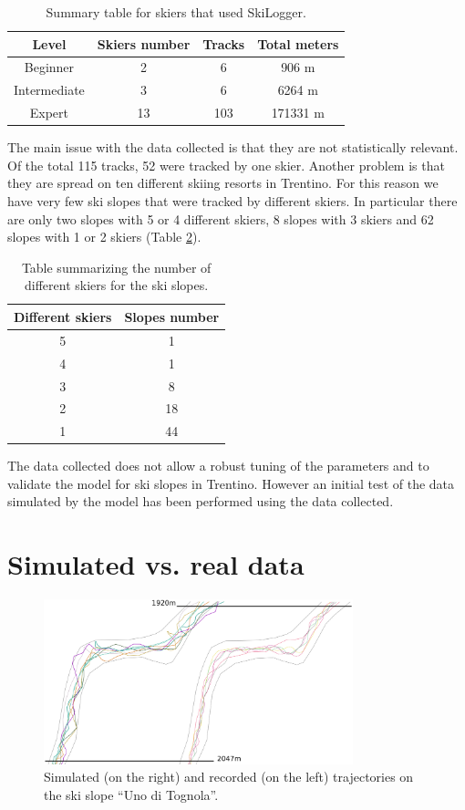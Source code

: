 \documentclass[12pt,a4paper,twoside]{book}
\begin{document}
\begin{table}[!h]
  \centering
  \begin{tabular}{ | c | c | c | c | }
    \hline
    Level & Skiers number & Tracks & Total meters \\
    \hline
    Beginner & 2  & 6 & 906 m \\
    Intermediate & 3 & 6 & 6264 m \\
    Expert & 13 & 103 & 171331 m \\
    \hline
  \end{tabular}
  \caption{Summary table for skiers that used SkiLogger.}
  \label{skiers}
\end{table}

The main issue with the data collected is that they are not statistically relevant. Of the total 115 tracks, 52 were tracked by one skier. Another problem is that they are spread on ten different skiing resorts in Trentino. For this reason we have very few ski slopes that were tracked by different skiers. In particular there are only two slopes with 5 or 4 different skiers, 8 slopes with 3 skiers and 62 slopes with 1 or 2 skiers (Table \ref{slopes}).

\begin{table}[!h]
  \centering
  \begin{tabular}{ | c | c | }
    \hline
    Different skiers & Slopes number \\
    \hline
    5 & 1 \\
    4 & 1 \\
    3 & 8 \\
    2 & 18 \\
    1 & 44 \\
    \hline
  \end{tabular}
  \caption{Table summarizing the number of different skiers for the ski slopes.}
  \label{slopes}
\end{table}

The data collected does not allow a robust tuning of the parameters and to validate the model for ski slopes in Trentino. However an initial test of the data simulated by the model has been performed using the data collected.

\section{Simulated vs. real data}
\begin{figure}[!h]
  \centering
    \includegraphics[width=0.8\textwidth]{images/traiettorie.eps}
    \caption{Simulated (on the right) and recorded (on the left) trajectories on the ski slope ``Uno di Tognola''.}\label{traj}
\end{figure}
\end{document}
